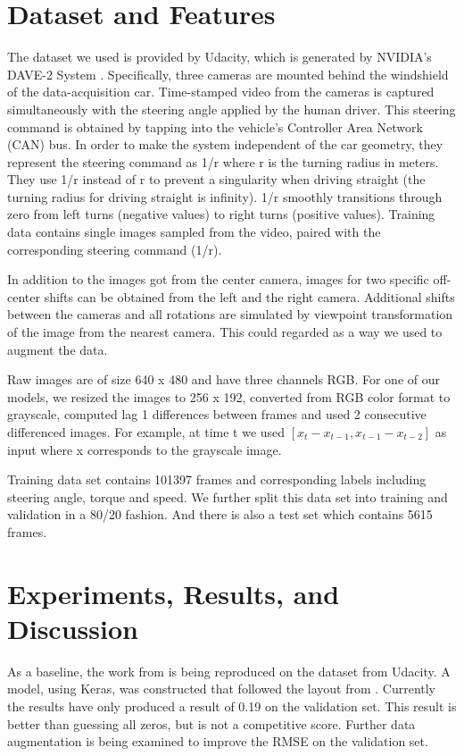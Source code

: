 \documentclass[10pt,twocolumn,letterpaper]{article}
\begin{document}
\section{Dataset and Features}
The dataset we used is provided by Udacity, which is generated by NVIDIA’s DAVE-2 System \cite{bojarski2016end}. Specifically, three cameras are mounted behind the windshield of the data-acquisition car. Time-stamped video from the cameras is captured simultaneously with the steering angle applied by the human driver. This steering command is obtained by tapping into the vehicle’s Controller Area Network (CAN) bus. In order to make the system independent of the car geometry, they represent the steering command as 1/r where r is the turning radius in meters. They use 1/r instead of r to prevent a singularity when driving straight (the turning radius for driving straight is infinity). 1/r smoothly transitions through zero from left turns (negative values) to right turns (positive values). Training data contains single images sampled from the video, paired with the corresponding steering command (1/r).

In addition to the images got from the center camera, images for two specific off-center shifts can be obtained from the left and the right camera. Additional shifts between the cameras and all rotations are simulated by viewpoint transformation of the image from the nearest camera. This could regarded as a way we used to augment the data.

Raw images are of size 640 x 480 and have three channels RGB. For one of our models, we resized the images to 256 x 192, converted from RGB color format to grayscale, computed lag 1 differences between frames and used 2 consecutive differenced images. For example, at time t we used $[x_{t} - x_{t-1}, x_{t-1} - x_{t-2}]$ as input where x corresponds to the grayscale image.

Training data set contains 101397 frames and corresponding labels including steering angle, torque and speed. We further split this data set into training and validation in a 80/20 fashion. And there is also a test set which contains 5615 frames. 

\section{Experiments, Results, and Discussion}
As a baseline, the work from \cite{bojarski2016end} is being reproduced on the dataset from Udacity. A model, using Keras, was constructed that followed the layout from \cite{bojarski2016end}. Currently the results have only produced a result of 0.19 on the validation set. This result is better than guessing all zeros, but is not a competitive score. Further data augmentation is being examined to improve the RMSE on the validation set.
\end{document}
